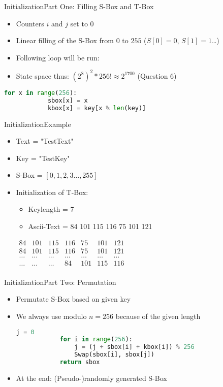 \documentclass[
	aspectratio=169,	%
	onlytextwidth,		%
	t,					%
	]{beamer}
\begin{document}
\begin{frame}[fragile]{Initialization}{Part One: Filling S-Box and T-Box}
	\begin{itemize}
		\item Counters $i$ and $j$ set to $0$
		\item Linear filling of the S-Box from $0$ to $255$ ($S[0] = 0$, $S[1] = 1$\dots)
		\item Following loop will be run:
		\item State space thus: $(2^{8})^2 * 256! \approx 2^{1700}$ (Question 6)
	\end{itemize}
	\begin{lstlisting}[language=Python]
		for x in range(256):
			sbox[x] = x
			kbox[x] = key[x % len(key)]
	\end{lstlisting}
\end{frame}


\begin{frame}{Initialization}{Example}
	\begin{itemize}
		\item Text = "TestText"
		\item Key = "TestKey"
		\item S-Box = $[0, 1, 2, 3 \dots, 255]$
		\item Initialization of T-Box:
		\begin{itemize}
			\item Keylength = 7
			\item Ascii-Text = 84 101 115 116 75 101 121
		\end{itemize}
		\medskip
		$\begin{array}{|ccccccc|}
		84 & 101 & 115 & 116 & 75 & 101 & 121 \\
		84 & 101 & 115 & 116 & 75 & 101 & 121 \\
		\dots & \dots & \dots & \dots & \dots & \dots & \dots \\
		\dots & \dots & \dots & 84 & 101 & 115 & 116 \\
		\end{array}$
	\end{itemize}
\end{frame}


\begin{frame}[fragile]{Initialization}{Part Two: Permutation}
	\begin{itemize}
		\item Permutate S-Box based on given key
		\item We always use modulo $n = 256$ because of the given length
		\begin{lstlisting}[language=Python]
			j = 0
			for i in range(256):
				j = (j + sbox[i] + kbox[i]) % 256
				Swap(sbox[i], sbox[j])
			return sbox
		\end{lstlisting}
		\item At the end: (Pseudo-)randomly generated S-Box
		
	\end{itemize}
\end{frame}
\end{document}
